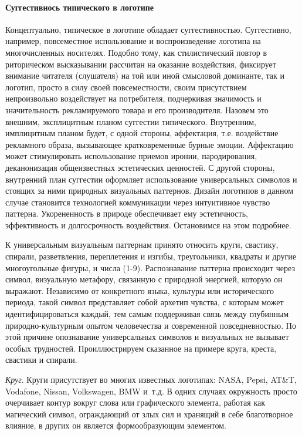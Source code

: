 \paragraph{Суггестивнось типического в логотипе}
Концептуально, типическое в логотипе обладает суггестивностью. Суггестивно,
например, повсеместное использование и воспроизведение логотипа на
многочисленных носителях. Подобно тому, как стилистический повтор в риторическом
высказывании рассчитан на оказание воздействия, фиксирует внимание
читателя (слушателя) на той или иной смысловой доминанте, так и логотип,
просто в силу своей повсеместности, своим присутствием непроизвольно
воздействует на потребителя, подчеркивая значимость и значительность
рекламируемого товара и его производителя. Назовем это внешним, эксплицитным
планом суггестии типического. Внутренним, имплицитным планом будет, с одной
стороны, аффектация, т.е. воздействие рекламного образа, вызывающее
кратковременные бурные эмоции. Аффектацию может стимулировать использование
приемов иронии, пародирования, деканонизация общеизвестных эстетических
ценностей. С другой стороны, внутренний план суггестии оформляет  использование
универсальных символов и стоящих за ними природных визуальных паттернов.
Дизайн логотипов в данном случае становится технологией коммуникации через
интуитивное чувство паттерна. Укорененность в природе обеспечивает ему
эстетичность, эффективность и долгосрочность воздействия\autocite[][9]{macnab2008decoding}. Остановимся
на этом подробнее.

К универсальным визуальным паттернам принято относить  круги, свастику, спирали,
разветвления, переплетения и изгибы, треугольники, квадраты и другие многоугольные
фигуры, и числа (1-9). Распознавание паттерна происходит через символ, визуальную
метафору, связанную с природной энергией, которую он выражают. Независимо от
конкретного языка, культуры или исторического периода, такой символ представляет
собой архетип чувства, с которым может идентифицироваться каждый, тем самым
поддерживая связь между глубинным природно-культурным опытом человечества и
современной повседневностью. По этой причине опознавание универсальных символов
и визуальных не вызывает особых трудностей. Проиллюстрируем сказанное на примере
круга, креста, свастики и спирали.

\emph{Круг}. Круги присутствует во многих известных логотипах: NASA, Pepsi,
  AT\&T, Vodafone, Nissan, Volkswagen, BMW и~т.д. В одних случаях окружность
  просто очерчивает контур вокруг слова или графического элемента, работая
  как магический символ, ограждающий от злых сил и хранящий в себе благотворное
  влияние, в других он является формообразующим элементом.

